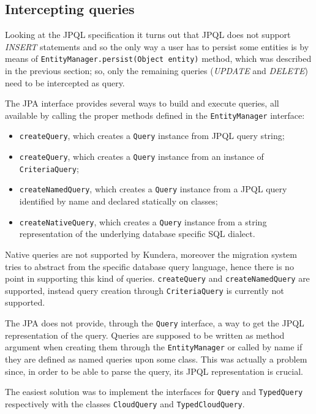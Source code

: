 \subsection{Intercepting queries}
Looking at the JPQL specification \cite{book:projpa2} it turns out that JPQL does not support \textit{INSERT} statements and so the only way a user has to persist some entities is by means of \texttt{EntityManager.persist(Object entity)} method, which was described in the previous section; so, only the remaining queries (\textit{UPDATE} and \textit{DELETE}) need to be intercepted as query.

\noindent The JPA interface provides several ways to build and execute queries, all available by calling the proper methods defined in the \texttt{EntityManager} interface: 
\begin{itemize}
\item \texttt{createQuery}, which creates a \texttt{Query} instance from JPQL query string;
\item \texttt{createQuery}, which creates a \texttt{Query} instance from an instance of \texttt{CriteriaQuery};
\item \texttt{createNamedQuery}, which creates a \texttt{Query} instance from a JPQL query identified by name and declared statically on classes; 
\item \texttt{createNativeQuery}, which creates a \texttt{Query} instance from a string representation of the underlying database specific SQL dialect.
\end{itemize}
 
\noindent Native queries are not supported by Kundera, moreover the migration system tries to abstract from the specific database query language, hence there is no point in supporting this kind of queries. \texttt{createQuery} and \texttt{createNamedQuery} are supported, instead query creation through \texttt{CriteriaQuery} is currently not supported.

\newparagraph The JPA does not provide, through the \texttt{Query} interface, a way to get the JPQL representation of the query. Queries are supposed to be written as method argument when creating them through the \texttt{EntityManager} or called by name if they are defined as named queries upon some class.
This was actually a problem since, in order to be able to parse the query, its JPQL representation is crucial.

\noindent The easiest solution was to implement the interfaces for \texttt{Query} and \texttt{TypedQuery} respectively with the classes \texttt{CloudQuery} and \texttt{TypedCloudQuery}. 

